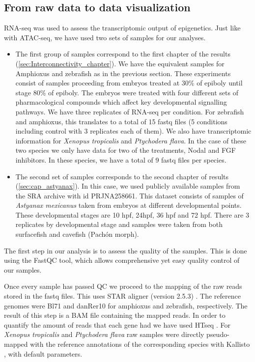 \subsection{From raw data to data visualization}

RNA-seq was used to assess the transcriptomic output of epigenetics. Just like with ATAC-seq, we have used two sets of samples for our analyses.
\begin{itemize}
    \item The first group of samples correspond to the first chapter of the results (\ref{sec:Interconnectivity_chapter}). We have the equivalent samples for Amphioxus and zebrafish as in the previous section. These experiments consist of samples proceeding from embryos treated at 30\% of epiboly until stage 80\% of epiboly. The embryos were treated with four different sets of pharmacological compounds which affect key developmental signalling pathways. We have three replicates of RNA-seq per condition. For zebrafish and amphioxus, this translates to a total of 15 fastq files (5 conditions including control with 3 replicates each of them). We also have transcriptomic information for \textit{Xenopus tropicalis} and \textit{Ptychodera flava}. In the case of these two species we only have data for two of the treatments, Nodal and FGF inhibitors. In these species, we have a total of 9 fastq files per species.
    \item The second set of samples corresponds to the second chapter of results (\ref{sec:cap_astyanax}). In this case, we used publicly available samples from the SRA archive with id PRJNA258661. This dataset consists of samples of \textit{Astyanax mexicanus} taken from embryos at different developmental points. These developmental stages are 10 hpf, 24hpf, 36 hpf and 72 hpf. There are 3 replicates by developmental stage and samples were taken from both surfacefish and cavefish (Pachón morph). 

\end{itemize}

The first step in our analysis is to assess the quality of the samples. This is done using the FastQC tool, which allows comprehensive yet easy quality control of our samples. 

Once every sample has passed QC we proceed to the mapping of the raw reads stored in the fastq files. This uses STAR aligner (version 2.5.3) \parencite{dobin_star_2013}. The reference genomes were Bl71 and danRer10 for amphioxus and zebrafish, respectively. The result of this step is a BAM file containing the mapped reads. In order to quantify the amount of reads that each gene had we have used HTseq \parencite{anders_htseq-python_2015}. For \textit{Xenopus tropicalis} and \textit{Ptychodera flava} raw samples were directly pseudo-mapped with the reference annotations of the corresponding species with Kallisto \parencite{bray_near-optimal_2016}, with default parameters. 

